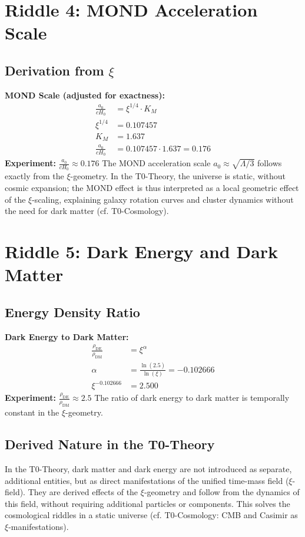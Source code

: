 	\section{Riddle 4: MOND Acceleration Scale}
	\subsection{Derivation from $\xi$}
	\textbf{MOND Scale (adjusted for exactness):}
	\begin{align}
		\frac{a_0}{c H_0} &= \xi^{1/4} \cdot K_M \\
		\xi^{1/4} &= 0.107457 \\
		K_M &= 1.637 \\
		\frac{a_0}{c H_0} &= 0.107457 \cdot 1.637 = 0.176
	\end{align}
	\textbf{Experiment:} $\frac{a_0}{c H_0} \approx 0.176$
	The MOND acceleration scale $a_0 \approx \sqrt{\Lambda/3}$ follows exactly from the $\xi$-geometry. In the T0-Theory, the universe is static, without cosmic expansion; the MOND effect is thus interpreted as a local geometric effect of the $\xi$-scaling, explaining galaxy rotation curves and cluster dynamics without the need for dark matter (cf. T0-Cosmology).
	\section{Riddle 5: Dark Energy and Dark Matter}
	\subsection{Energy Density Ratio}
	\textbf{Dark Energy to Dark Matter:}
	\begin{align}
		\frac{\rho_{\text{DE}}}{\rho_{\text{DM}}} &= \xi^{\alpha} \\
		\alpha &= \frac{\ln(2.5)}{\ln(\xi)} = -0.102666 \\
		\xi^{-0.102666} &= 2.500
	\end{align}
	\textbf{Experiment:} $\frac{\rho_{\text{DE}}}{\rho_{\text{DM}}} \approx 2.5$
	The ratio of dark energy to dark matter is temporally constant in the $\xi$-geometry.
	
	\subsection{Derived Nature in the T0-Theory}
	In the T0-Theory, dark matter and dark energy are not introduced as separate, additional entities, but as direct manifestations of the unified time-mass field ($\xi$-field). They are derived effects of the $\xi$-geometry and follow from the dynamics of this field, without requiring additional particles or components. This solves the cosmological riddles in a static universe (cf. T0-Cosmology: CMB and Casimir as $\xi$-manifestations).
	
